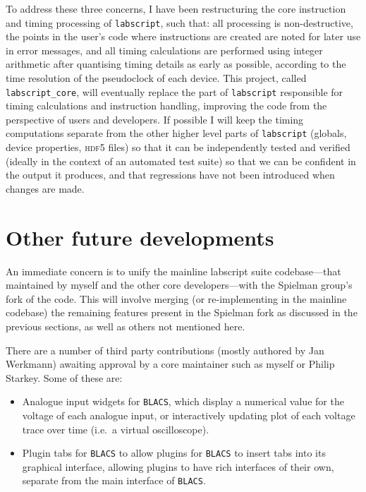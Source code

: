 To address these three concerns, I have been restructuring the core instruction and timing processing of \texttt{labscript}, such that: all processing is non-destructive, the points in the user's code where instructions are created are noted for later use in error messages, and all timing calculations are performed using integer arithmetic after quantising timing details as early as possible, according to the time resolution of the pseudoclock of each device. This project, called \texttt{labscript\_core}, will eventually replace the part of \texttt{labscript} responsible for timing calculations and instruction handling, improving the code from the perspective of users and developers. If possible I will keep the timing computations separate from the other higher level parts of \texttt{labscript} (globals, device properties, \textsc{hdf5} files) so that it can be independently tested and verified (ideally in the context of an automated test suite) so that we can be confident in the output it produces, and that regressions have not been introduced when changes are made.


\section{Other future developments}

An immediate concern is to unify the mainline labscript suite codebase---that maintained by myself and the other core developers---with the Spielman group's fork of the code. This will involve merging (or re-implementing in the mainline codebase) the remaining features present in the Spielman fork as discussed in the previous sections, as well as others not mentioned here.

There are a number of third party contributions (mostly authored by Jan Werkmann) awaiting approval by a core maintainer such as myself or Philip Starkey. Some of these are:
\begin{itemize}
    \item Analogue input widgets for \texttt{BLACS}, which display a numerical value for the voltage of each analogue input, or interactively updating plot of each voltage trace over time (i.e.~a virtual oscilloscope).
    \item Plugin tabs for \texttt{BLACS} to allow plugins for \texttt{BLACS} to insert tabs into its graphical interface, allowing plugins to have rich interfaces of their own, separate from the main interface of \texttt{BLACS}.
\end{itemize}

